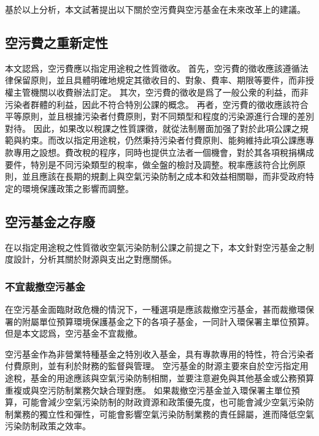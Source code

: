 \documentclass[12pt,a4paper]{article}
\begin{document}
基於以上分析，本文試著提出以下關於空污費與空污基金在未來改革上的建議。

\subsection{空污費之重新定性}

本文認爲，空污費應以指定用途稅之性質徵收。
首先，空污費的徵收應該遵循法律保留原則，並且具體明確地規定其徵收目的、對象、費率、期限等要件，而非授權主管機關以收費辦法訂定。
其次，空污費的徵收是爲了一般公衆的利益，而非污染者群體的利益，因此不符合特別公課的概念。
再者，空污費的徵收應該符合平等原則，並且根據污染者付費原則，對不同類型和程度的污染源進行合理的差別對待。
因此，如果改以稅課之性質課徵，就從法制層面加强了對於此項公課之規範與約束。而改以指定用途稅，仍然秉持污染者付費原則、能夠維持此項公課應專款專用之設想。費改稅的程序，同時也提供立法者一個機會，對於其各項稅捐構成要件，特別是不同污染類型的稅率，做全盤的檢討及調整。稅率應該符合比例原則，並且應該在長期的規劃上與空氣污染防制之成本和效益相關聯，而非受政府特定的環境保護政策之影響而調整。



\subsection{空污基金之存廢}

在以指定用途稅之性質徵收空氣污染防制公課之前提之下，本文針對空污基金之制度設計，分析其關於財源與支出之對應關係。

\subsubsection{不宜裁撤空污基金}

在空污基金面臨財政危機的情況下，一種選項是應該裁撤空污基金，甚而裁撤環保署的附屬單位預算環境保護基金之下的各項子基金，一同計入環保署主單位預算。但是本文認爲，空污基金不宜裁撤。

空污基金作為非營業特種基金之特別收入基金，具有專款專用的特性，符合污染者付費原則，並有利於財務的監督與管理。
空污基金的財源主要來自於空污指定用途稅，基金的用途應該與空氣污染防制相關，並要注意避免與其他基金或公務預算重複或與空污防制業務欠缺合理對應。
如果裁撤空污基金並入環保署主單位預算，可能會減少空氣污染防制的財政資源和政策優先度，也可能會減少空氣污染防制業務的獨立性和彈性，可能會影響空氣污染防制業務的責任歸屬，進而降低空氣污染防制政策之效率。
\end{document}
